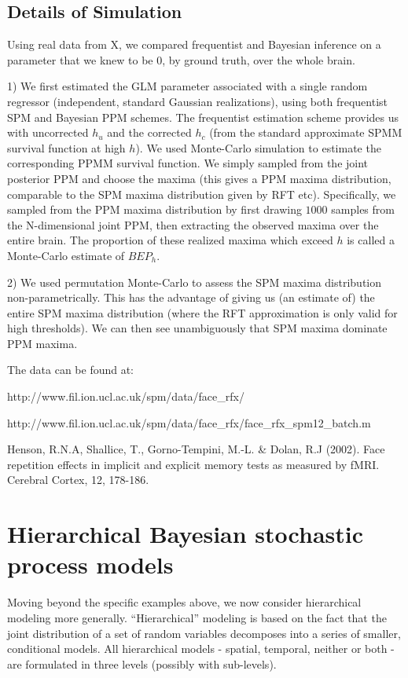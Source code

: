 \documentclass{article}
\begin{document}
\subsection{Details of Simulation}

Using real data from X, we compared frequentist and Bayesian inference on a parameter that we knew to be $0$, by ground truth, over the whole brain.

1) We first estimated the GLM parameter associated with a single random regressor (independent, standard Gaussian realizations), using both frequentist SPM and Bayesian PPM schemes. The frequentist estimation scheme provides us with uncorrected $h_u$ and the corrected $h_c$ (from the standard approximate SPMM survival function at high $h$). We used Monte-Carlo simulation to estimate the corresponding PPMM survival function. We simply sampled from the joint posterior PPM and choose the maxima (this gives a PPM maxima distribution, comparable to the SPM maxima distribution given by RFT etc). Specifically, we sampled from the PPM maxima distribution by first drawing $1000$ samples from the N-dimensional joint PPM, then extracting the observed maxima over the entire brain. The proportion of these realized maxima which exceed $h$ is called a Monte-Carlo estimate of $BEP_h$. 

2) We used permutation Monte-Carlo to assess the SPM maxima distribution non-parametrically. This has the advantage of giving us (an estimate of) the entire SPM maxima distribution (where the RFT approximation is only valid for high thresholds). We can then see unambiguously that SPM maxima dominate PPM maxima.

The data can be found at:

http://www.fil.ion.ucl.ac.uk/spm/data/face_rfx/

http://www.fil.ion.ucl.ac.uk/spm/data/face_rfx/face_rfx_spm12_batch.m

Henson, R.N.A, Shallice, T., Gorno-Tempini, M.-L. & Dolan, R.J (2002). Face repetition effects in implicit and explicit memory tests as measured by fMRI. Cerebral Cortex, 12, 178-186.

\section{Hierarchical Bayesian stochastic process models}

Moving beyond the specific examples above, we now consider hierarchical modeling more generally. ``Hierarchical'' modeling is based on the fact that the joint distribution of a set of random variables decomposes into a series of smaller, conditional models. All hierarchical models - spatial, temporal, neither or both - are formulated in three levels (possibly with sub-levels).
\end{document}

